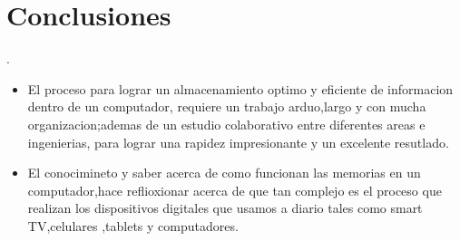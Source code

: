\documentclass{article}
\begin{document}
\section{Conclusiones}.\label{conclusiones}
\begin{itemize}
    \item El proceso para lograr un almacenamiento optimo y eficiente de informacion dentro de un computador, requiere un trabajo arduo,largo y con mucha organizacion;ademas de un estudio colaborativo entre diferentes areas e ingenierias, para lograr una rapidez impresionante y un excelente resutlado.
    \item El conocimineto y saber acerca de como funcionan las memorias en un computador,hace reflioxionar acerca de que tan complejo es el proceso que realizan los dispositivos digitales que usamos a diario tales como smart TV,celulares ,tablets y  computadores.
\end{itemize}

\newpage


\noindent

\end{document}
